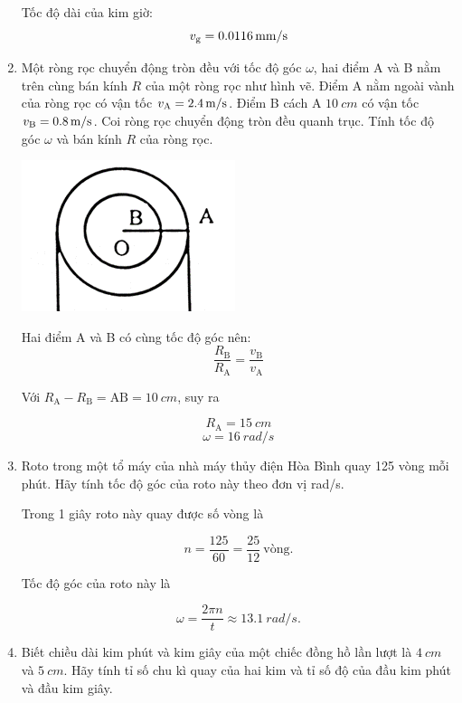 \begin{enumerate}[label=\bfseries Câu \arabic*:]
{		Tốc độ dài của kim giờ:
		$$v_\text g = \SI{0.0116}{mm/s}$$	
	}
		\item {}
	
	
	{
		Một ròng rọc chuyển động tròn đều với tốc độ góc $\omega$, hai điểm A và B nằm trên cùng bán kính $R$ của một ròng rọc như hình vẽ.
		Điểm A nằm ngoài vành của ròng rọc có vận tốc $v_\text A = \SI{2.4}{m/s}$. Điểm B cách A $\SI{10}{cm}$ có vận tốc $v_\text B = \SI{0.8}{m/s}$. Coi ròng rọc chuyển động tròn đều quanh trục. Tính tốc độ góc $\omega$ và bán kính $R$ của ròng rọc.
		\begin{center}
			\includegraphics[scale=0.4]{../figs/VN10-2021-PH-TP006-1.png}
		\end{center}
		
	}
	
	\hideall
	{	
		Hai điểm A và B có cùng tốc độ góc nên:
		$$\dfrac{R_\text{B}}{R_\text{A}} = \dfrac{v_\text{B}}{v_\text{A}}$$
		
		Với $R_\text{A} - R_\text{B} = \text{AB} = \SI{10}{cm}$, suy ra
		
		$$R_\text{A} =\SI{15}{cm}$$
		$$\omega=\SI{16}{rad/s}$$
	}
	\item {}
	
	
	{
		Roto trong một tổ máy của nhà máy thủy điện Hòa Bình quay 125 vòng mỗi phút. Hãy tính tốc độ góc của roto này theo đơn vị rad/s.
	}
	
	\hideall
	{	
		Trong 1 giây roto này quay được số vòng là
		
		$$n=\dfrac{125}{60} = \dfrac{25}{12}\ \text{vòng}.$$
		
		Tốc độ góc của roto này là
		
		$$\omega = \dfrac{2\pi n}{t} \approx \SI{13,1}{rad/s}.$$
	}
		\item {}
	
	
	{
		Biết chiều dài kim phút và kim giây của một chiếc đồng hồ lần lượt là $\SI{4}{cm}$ và $\SI{5}{cm}.$ Hãy tính tỉ số chu kì quay của hai kim và  tỉ số độ của đầu kim phút và đầu kim giây.
		
		
	}
	

\end{enumerate}

